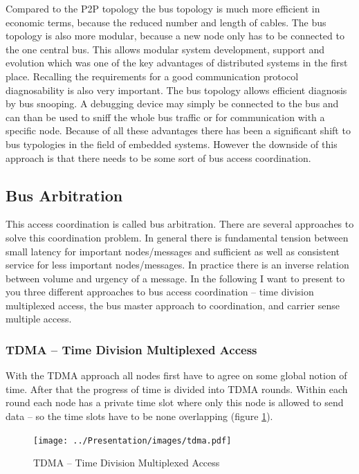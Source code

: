 \documentclass[pdftex,12pt,a4paper,fleqn]{scrartcl}
\begin{document}
Compared to the P2P topology the bus topology is much more efficient in economic terms, because the reduced number and length of cables. The bus topology is also more modular, because a new node only has to be connected to the one central bus. This allows modular system development, support and evolution which was one of the key advantages of distributed systems in the first place. Recalling the requirements for a good communication protocol diagnosability is also very important. The bus topology allows efficient diagnosis by bus snooping. A debugging device may simply be connected to the bus and can than be used to sniff the whole bus traffic or for communication with a specific node. Because of all these advantages there has been a significant shift to bus typologies in the field of embedded systems. However the downside of this approach is that there needs to be some sort of bus access coordination.

\subsection{Bus Arbitration}
This access coordination is called bus arbitration. There are several approaches to solve this coordination problem. In general there is fundamental tension between small latency for important nodes/messages and sufficient as well as consistent service for less important nodes/messages. In practice there is an inverse relation between volume and urgency of a message. In the following I want to present to you three different approaches to bus access coordination -- time division multiplexed access, the bus master approach to coordination, and carrier sense multiple access.

\subsubsection{TDMA -- Time Division Multiplexed Access}
With the TDMA approach all nodes first have to agree on some global notion of time. After that the progress of time is divided into TDMA rounds. Within each round each node has a private time slot where only this node is allowed to send data – so the time slots have to be none overlapping (figure \ref{fig:tdma}).
 
\begin{figure}[h]	
	\centering
  \texttt{[image: ../Presentation/images/tdma.pdf]}
  \caption{TDMA -- Time Division Multiplexed Access}
  \label{fig:tdma}
\end{figure}
\end{document}
